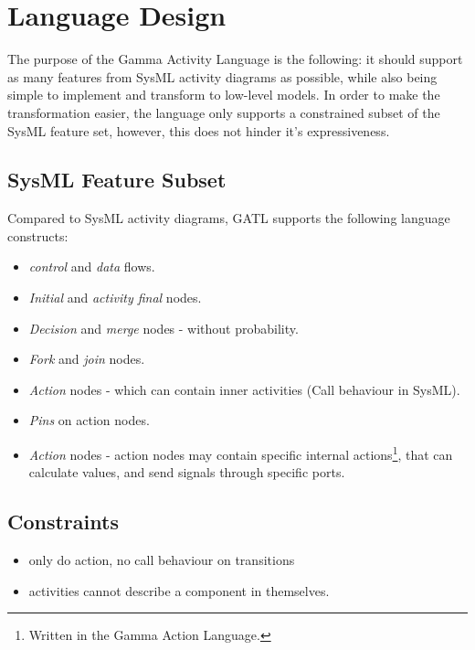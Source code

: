 \section{Language Design}

The purpose of the Gamma Activity Language is the following: it should support as many features from SysML activity diagrams as possible, while also being simple to implement and transform to low-level models. In order to make the transformation easier, the language only supports a constrained subset of the SysML feature set, however, this does not hinder it's expressiveness.

\subsection{SysML Feature Subset}

Compared to SysML activity diagrams, GATL supports the following language constructs:

\begin{itemize}
	\item \emph{control} and \emph{data} flows.
	\item \emph{Initial} and \emph{activity final} nodes.
	\item \emph{Decision} and \emph{merge} nodes - without probability.
	\item \emph{Fork} and \emph{join} nodes.
	\item \emph{Action} nodes - which can contain inner activities (Call behaviour in SysML).
	\item \emph{Pins} on action nodes.
	\item \emph{Action} nodes - action nodes may contain specific internal actions\footnote{Written in the Gamma Action Language.}, that can calculate values, and send signals through specific ports.
\end{itemize}

\subsection{Constraints}\label{ssec:activity-constraints}


\begin{itemize}
	\item only do action, no call behaviour on transitions
	\item activities cannot describe a component in themselves.
\end{itemize}
